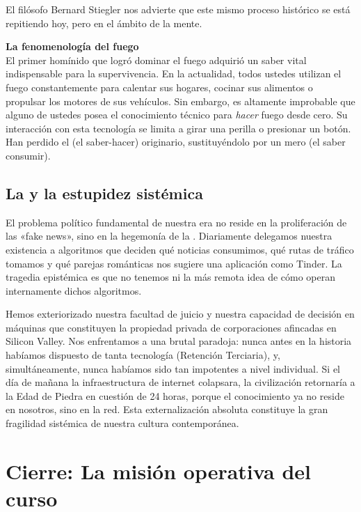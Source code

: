 El filósofo Bernard Stiegler nos advierte que este mismo proceso histórico se está repitiendo hoy, pero en el ámbito de la mente.

\begin{ejemplo}
\textbf{La fenomenología del fuego}\\
El primer homínido que logró dominar el fuego adquirió un saber vital indispensable para la supervivencia. En la actualidad, todos ustedes utilizan el fuego constantemente para calentar sus hogares, cocinar sus alimentos o propulsar los motores de sus vehículos. Sin embargo, es altamente improbable que alguno de ustedes posea el conocimiento técnico para \textit{hacer} fuego desde cero. Su interacción con esta tecnología se limita a girar una perilla o presionar un botón. Han perdido el \SavoirFaire{} (el saber-hacer) originario, sustituyéndolo por un mero \SavoirVivre{} (el saber consumir).
\end{ejemplo}

\subsection{La \CajaNegra{} y la estupidez sistémica}

El problema político fundamental de nuestra era no reside en la proliferación de las «fake news», sino en la hegemonía de la \CajaNegra{}. Diariamente delegamos nuestra existencia a algoritmos que deciden qué noticias consumimos, qué rutas de tráfico tomamos y qué parejas románticas nos sugiere una aplicación como Tinder. La tragedia epistémica es que no tenemos ni la más remota idea de cómo operan internamente dichos algoritmos.

Hemos exteriorizado nuestra facultad de juicio y nuestra capacidad de decisión en máquinas que constituyen la propiedad privada de corporaciones afincadas en Silicon Valley. Nos enfrentamos a una brutal paradoja: nunca antes en la historia habíamos dispuesto de tanta tecnología (Retención Terciaria), y, simultáneamente, nunca habíamos sido tan impotentes a nivel individual. Si el día de mañana la infraestructura de internet colapsara, la civilización retornaría a la Edad de Piedra en cuestión de 24 horas, porque el conocimiento ya no reside en nosotros, sino en la red. Esta externalización absoluta constituye la gran fragilidad sistémica de nuestra cultura contemporánea.

\section{Cierre: La misión operativa del curso}

